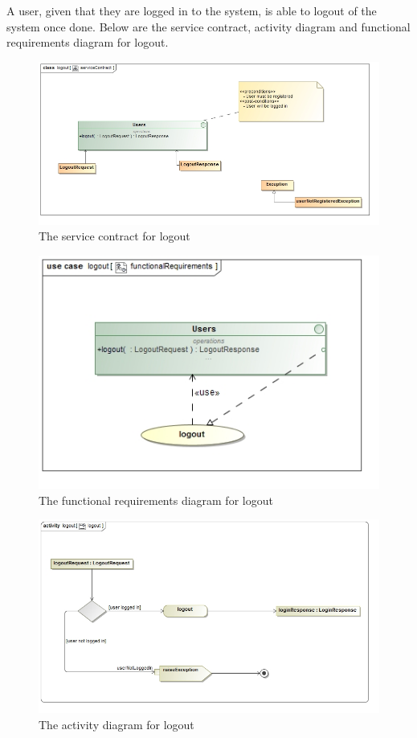 A user, given that they are logged in to the system, is able to logout of the system once done. Below are the service contract, activity diagram and functional requirements diagram for logout.

\begin{figure}[H]
	\centering
	\includegraphics[width=1.0\textwidth]{../images/funcReq/logoutServiceContract.jpg}
	\caption{The service contract for logout \label{overflow}}
\end{figure}

\begin{figure}[H]
	\centering
	\includegraphics[width=1.0\textwidth]{../images/funcReq/logoutFunctionalRequirements.jpg}
	\caption{The functional requirements diagram for logout \label{overflow}}
\end{figure}

\begin{figure}[H]
	\centering
	\includegraphics[width=1.0\textwidth]{../images/funcReq/logoutActivityDiagram.jpg}
	\caption{The activity diagram for logout \label{overflow}}
\end{figure}

